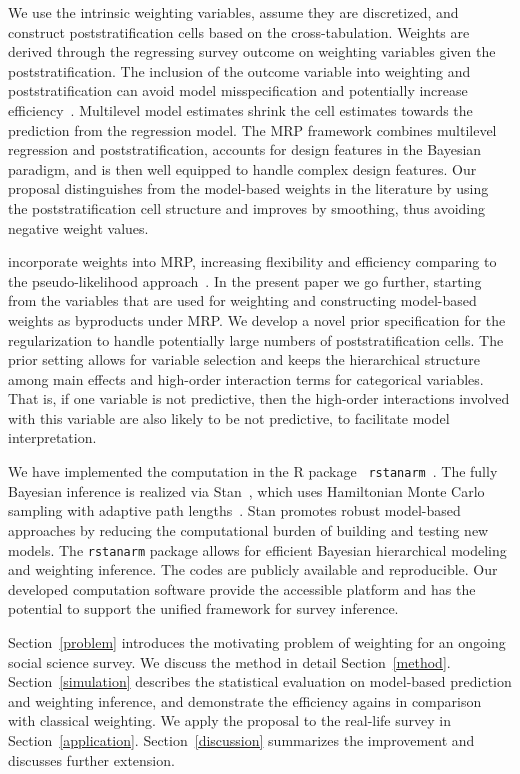 \documentclass[11pt]{article}
\numberwithin{figure}{section}
\numberwithin{table}{section}
\numberwithin{equation}{section}
\begin{document}
We use the intrinsic weighting variables, assume they are discretized, and
construct poststratification cells based on the cross-tabulation. Weights are
derived through the regressing survey outcome on weighting variables given the
poststratification. The inclusion of the outcome variable into weighting and
poststratification can avoid model misspecification and potentially increase
efficiency~\citep{fuller09}. Multilevel model estimates shrink the cell
estimates towards the prediction from the regression model. The MRP framework
combines multilevel regression and poststratification, accounts for design
features in the Bayesian paradigm, and is then well equipped to handle complex
design features. Our proposal distinguishes from the model-based weights in the
literature by using the poststratification cell structure and improves by
smoothing, thus avoiding negative weight values.

\cite{bnfp:ba15} incorporate weights into MRP, increasing flexibility and
efficiency comparing to the pseudo-likelihood approach~\citep{pfeffermann93}.
In the present paper we go further, starting from the variables that are used
for weighting and constructing model-based weights as byproducts under MRP. We
develop a novel prior specification for the regularization to handle
potentially large numbers of poststratification cells. The prior setting allows
for variable selection and keeps the hierarchical structure among main effects
and high-order interaction terms for categorical variables. That is, if one
variable is not predictive, then the high-order interactions involved with this
variable are also likely to be not predictive, to facilitate model
interpretation.

We have implemented the computation in the R package {\tt
rstanarm}~\citep{rstanarm}. The fully Bayesian inference is realized via
Stan~\citep{stan-software:2013,stan-manual:2013}, which uses Hamiltonian Monte
Carlo sampling with adaptive path lengths~\citep{hoffman-gelman:2012}.  Stan
promotes robust model-based approaches by reducing the computational burden of
building and testing new models. The {\tt rstanarm} package allows for
efficient Bayesian hierarchical modeling and weighting inference. The codes are
publicly available and reproducible. Our developed computation software provide
the accessible platform and has the potential to support the unified framework
for survey inference.

Section~\ref{problem} introduces the motivating problem of weighting for an
ongoing social science survey. We discuss the method in detail
Section~\ref{method}. Section~\ref{simulation} describes the statistical
evaluation on model-based prediction and weighting inference, and demonstrate
the efficiency agains in comparison with classical weighting. We apply the
proposal to the real-life survey in Section~\ref{application}.
Section~\ref{discussion} summarizes the improvement and discusses further
extension.
\end{document}
